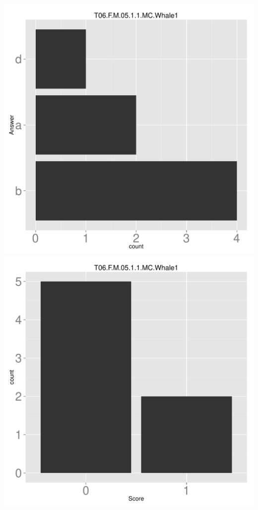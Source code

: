 \documentclass[12pt,english,nohyper]{tufte-handout}\usepackage[]{graphicx}\usepackage[]{color}
\begin{document}
\begin{center} \includegraphics[width=.45\linewidth]{Topic06_AB_48_answer} \includegraphics[width=.45\linewidth]{Topic06_AB_48_score} \end{center} 
\end{document}
